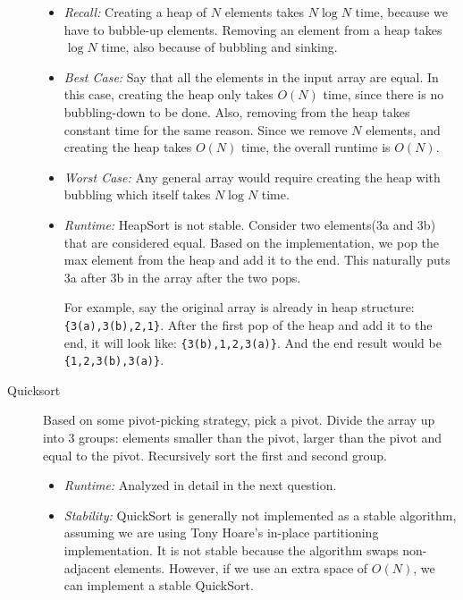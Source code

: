 \begin{solution}
\begin{description}
\begin{itemize}
\item \textit{Recall:} Creating a heap of $N$ elements takes $N \log N$ time,
because we have to bubble-up elements. Removing an element from a heap takes
$\log N$ time, also because of bubbling and sinking.
\item \textit{Best Case:} Say that all the elements in the input array are
equal. In this case, creating the heap only takes $O(N)$ time, since there is
no bubbling-down to be done. Also, removing from the heap takes constant time
for the same reason. Since we remove $N$ elements, and creating the heap takes
$O(N)$ time, the overall runtime is $O(N)$.
\item \textit{Worst Case:} Any general array would require creating the heap
with bubbling which itself takes $N \log N$ time.
\item \textit{Runtime:} HeapSort is not stable. Consider two elements(3a and 3b) that are considered equal. Based on the implementation, we pop the max element from the heap and add it to the end. This naturally puts 3a after 3b in the array after the two pops. 

For example, say the original array is already in heap structure:  
\lstinline${3(a),3(b),2,1}$. After the first pop of the heap and add it to the end, it will look like: \lstinline${3(b),1,2,3(a)}$. And the end result would be \lstinline${1,2,3(b),3(a)}$.
\end{itemize}


\item[Quicksort]
Based on some pivot-picking strategy, pick a pivot.  Divide the array up into 3
groups: elements smaller than the pivot, larger than the pivot and equal to the
pivot. Recursively sort the first and second group.

\begin{itemize}
\item \textit{Runtime:} Analyzed in detail in the next question.
\item \textit{Stability:} QuickSort is generally not implemented as a stable algorithm, assuming we are using Tony Hoare’s in-place partitioning implementation. It is not stable because the algorithm swaps non-adjacent elements.  However, if we use an extra space of $O(N)$, we can implement a stable QuickSort.
\end{itemize}
\end{description}
\end{solution}
